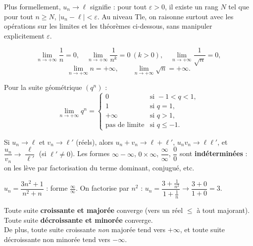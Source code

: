 \begin{remarque}
Plus formellement, $u_n\to\ell$ signifie : pour tout $\varepsilon>0$, il existe un rang $N$ tel que
pour tout $n\ge N$, $|u_n-\ell|<\varepsilon$. Au niveau Tle, on raisonne surtout avec les
opérations sur les limites et les théorèmes ci-dessous, sans manipuler explicitement $\varepsilon$.
\end{remarque}

\begin{propriete}
\[
\lim_{n\to+\infty}\frac1n=0,\quad \lim_{n\to+\infty}\frac1{n^k}=0\ (k>0),\quad
\lim_{n\to+\infty}\frac1{\sqrt n}=0,
\]
\[
\lim_{n\to+\infty}n=+\infty,\qquad\lim_{n\to+\infty}\sqrt n=+\infty.
\]
\end{propriete}

\begin{theoreme}
Pour la suite géométrique $(q^n)$ :
\[
\lim_{n\to+\infty}q^n=
\begin{cases}
0 & \text{si } -1<q<1,\\
1 & \text{si } q=1,\\
+\infty & \text{si } q>1,\\
\text{pas de limite} & \text{si } q\le-1.
\end{cases}
\]
\end{theoreme}

\begin{propriete}
Si $u_n\to\ell$ et $v_n\to\ell'$ (réels), alors $u_n+v_n\to\ell+\ell'$, $u_nv_n\to\ell\ell'$,
et $\dfrac{u_n}{v_n}\to\dfrac{\ell}{\ell'}$ (si $\ell'\ne0$). Les formes
$\infty-\infty$, $0\times\infty$, $\dfrac\infty\infty$, $\dfrac00$ sont \textbf{indéterminées} :
on les lève par factorisation du terme dominant, conjugué, etc.
\end{propriete}

\begin{exemple}
$u_n=\dfrac{3n^2+1}{n^2+n}$ : forme $\frac\infty\infty$. On factorise par $n^2$ :
$u_n=\dfrac{3+\frac1{n^2}}{1+\frac1n}\to\dfrac{3+0}{1+0}=3$.
\end{exemple}

\begin{theoreme}
Toute suite \textbf{croissante et majorée} converge (vers un réel $\le$ à tout majorant).
Toute suite \textbf{décroissante et minorée} converge. \\
De plus, toute suite croissante \emph{non} majorée tend vers $+\infty$, et toute suite
décroissante non minorée tend vers $-\infty$.
\end{theoreme}

